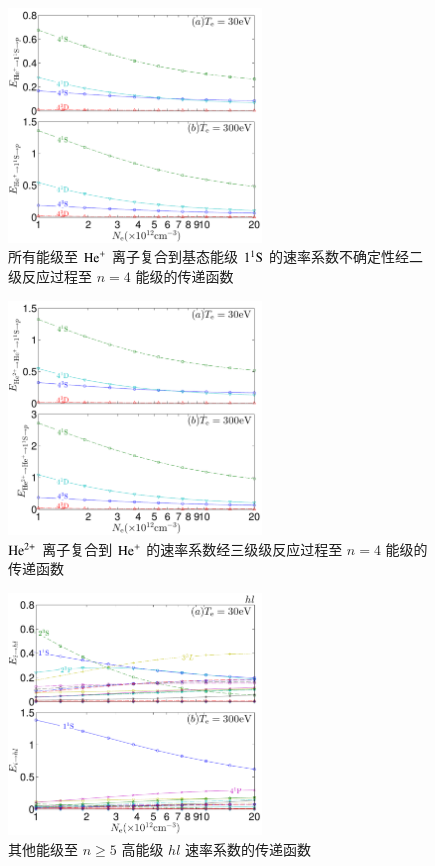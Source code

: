 \begin{figure}[H]
    \centering
    \includegraphics[width=0.6\textwidth]{HeII1p-error-propagation-coefficient.pdf}
    \caption{所有能级至 ${\rm He}^+$ 离子复合到基态能级 $1^1{\rm S}$ 的速率系数不确定性经二级反应过程至 $n=4$ 能级的传递函数}
    \label{fig:appendix:error-prop:6}
\end{figure}

\begin{figure}[H]
    \centering
    \includegraphics[width=0.6\textwidth]{HeIIIHeII1p-error-propagation-coefficient.pdf}
    \caption{${\rm He}^{2+}$ 离子复合到 ${\rm He}^+$ 的速率系数经三级级反应过程至 $n=4$ 能级的传递函数}
    \label{fig:appendix:error-prop:7}
\end{figure}

\begin{figure}[H]
    \centering
    \includegraphics[width=0.6\textwidth]{hl-error-propagation-coefficient.pdf}
    \caption{其他能级至 $n\ge5$ 高能级 $hl$ 速率系数的传递函数}
    \label{fig:appendix:error-prop:8}
\end{figure}
